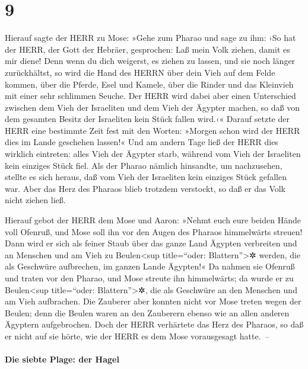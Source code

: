\hypertarget{section-8}{%
\section{9}\label{section-8}}

 Hierauf sagte der HERR zu Mose: »Gehe zum Pharao und sage
zu ihm: ›So hat der HERR, der Gott der Hebräer, gesprochen: Laß mein
Volk ziehen, damit es mir diene!  Denn wenn du dich
weigerst, es ziehen zu lassen, und sie noch länger zurückhältst,
 so wird die Hand des HERRN über dein Vieh auf dem Felde
kommen, über die Pferde, Esel und Kamele, über die Rinder und das
Kleinvieh mit einer sehr schlimmen Seuche.  Der HERR wird
dabei aber einen Unterschied zwischen dem Vieh der Israeliten und dem
Vieh der Ägypter machen, so daß von dem gesamten Besitz der Israeliten
kein Stück fallen wird.‹«  Darauf setzte der HERR eine
bestimmte Zeit fest mit den Worten: »Morgen schon wird der HERR dies im
Lande geschehen lassen!«  Und am andern Tage ließ der HERR
dies wirklich eintreten: alles Vieh der Ägypter starb, während vom Vieh
der Israeliten kein einziges Stück fiel.  Als der Pharao
nämlich hinsandte, um nachzusehen, stellte es sich heraus, daß vom Vieh
der Israeliten kein einziges Stück gefallen war. Aber das Herz des
Pharaos blieb trotzdem verstockt, so daß er das Volk nicht ziehen ließ.

 Hierauf gebot der HERR dem Mose und Aaron: »Nehmt euch
eure beiden Hände voll Ofenruß, und Mose soll ihn vor den Augen des
Pharaos himmelwärts streuen!  Dann wird er sich als feiner
Staub über das ganze Land Ägypten verbreiten und an Menschen und am Vieh
zu Beulen\textless sup title=``oder: Blattern''\textgreater✲ werden, die
als Geschwüre aufbrechen, im ganzen Lande Ägypten!«  Da
nahmen sie Ofenruß und traten vor den Pharao, und Mose streute ihn
himmelwärts; da wurde er zu Beulen\textless sup title=``oder:
Blattern''\textgreater✲, die als Geschwüre an den Menschen und am Vieh
aufbrachen.  Die Zauberer aber konnten nicht vor Mose
treten wegen der Beulen; denn die Beulen waren an den Zauberern ebenso
wie an allen anderen Ägyptern aufgebrochen.  Doch der
HERR verhärtete das Herz des Pharaos, so daß er nicht auf sie hörte, wie
der HERR es dem Mose vorausgesagt hatte.~--

\hypertarget{die-siebte-plage-der-hagel}{%
\paragraph{Die siebte Plage: der
Hagel}\label{die-siebte-plage-der-hagel}}


